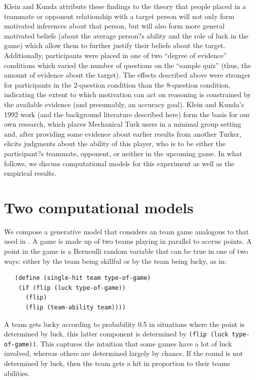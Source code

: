 \documentclass{article}
\begin{document}
Klein and Kunda attribute these findings to the theory that people placed in a teammate or opponent relationship with a target person will not only form motivated inferences about that person, but will also form more general motivated beliefs (about the average person?s ability and the role of luck in the game) which allow them to further justify their beliefs about the target. Additionally, participants were placed in one of two ``degree of evidence'' conditions which varied the number of questions on the ``sample quiz'' (thus, the amount of evidence about the target). The effects described above were stronger for participants in the 2-question condition than the 8-question condition, indicating the extent to which motivation can act on reasoning is constrained by the available evidence (and presumably, an accuracy goal). Klein and Kunda's 1992 work (and the background literature described here) form the basis for our own research, which places Mechanical Turk users in a minimal group setting and, after providing some evidence about earlier results from another Turker, elicits judgments about the ability of this player, who is to be either the participant?s teammate, opponent, or neither in the upcoming game. In what follows, we discuss computational models for this experiment as well as the empirical results.

\section{Two computational models}

We compose a generative model that considers an team game analogous to that used in \citet{Klein1992}. A game is made up of two teams playing in parallel to accrue points. A point in the game is a Bernoulli random variable that can be true in one of two ways: either by the team being skillful or by the team being lucky, as in:

\begin{lstlisting}
   (define (single-hit team type-of-game)
    (if (flip (luck type-of-game)) 
      (flip) 
      (flip (team-ability team))))
\end{lstlisting}

A team gets lucky according to probability 0.5 in situations where the point is determined by luck, this latter component is determined by \lstinline{(flip (luck type-of-game))}. This captures the intuition that some games have a lot of luck involved, whereas others are determined largely by chance. If the round is not determined by luck, then the team gets a hit in proportion to their teams abilities. 
\end{document}
